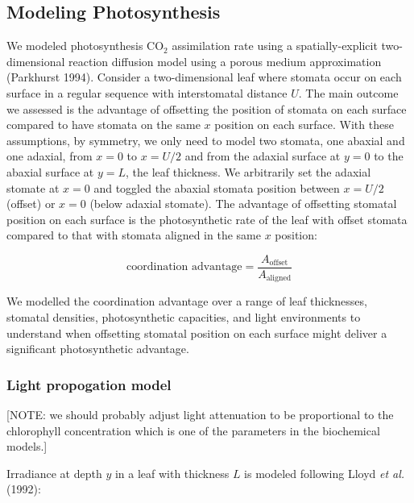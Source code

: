 \documentclass[12pt,halfline,a4paper,]{ouparticle}
\begin{document}
\hypertarget{modeling-photosynthesis}{%
\subsection{Modeling Photosynthesis}\label{modeling-photosynthesis}}

We modeled photosynthesis CO\(_2\) assimilation rate using a
spatially-explicit two-dimensional reaction diffusion model using a
porous medium approximation (Parkhurst 1994). Consider a two-dimensional
leaf where stomata occur on each surface in a regular sequence with
interstomatal distance \(U\). The main outcome we assessed is the
advantage of offsetting the position of stomata on each surface compared
to have stomata on the same \(x\) position on each surface. With these
assumptions, by symmetry, we only need to model two stomata, one abaxial
and one adaxial, from \(x = 0\) to \(x = U/2\) and from the adaxial
surface at \(y = 0\) to the abaxial surface at \(y = L\), the leaf
thickness. We arbitrarily set the adaxial stomate at \(x = 0\) and
toggled the abaxial stomata position between \(x = U/2\) (offset) or
\(x = 0\) (below adaxial stomate). The advantage of offsetting stomatal
position on each surface is the photosynthetic rate of the leaf with
offset stomata compared to that with stomata aligned in the same \(x\)
position:

\begin{equation} \label{eq:coordination_advantage}
  \text{coordination advantage} = \frac{A_\text{offset}}{A_\text{aligned}}
\end{equation}

We modelled the coordination advantage over a range of leaf thicknesses,
stomatal densities, photosynthetic capacities, and light environments to
understand when offsetting stomatal position on each surface might
deliver a significant photosynthetic advantage.

\hypertarget{light-propogation-model}{%
\subsubsection{Light propogation model}\label{light-propogation-model}}

{[}NOTE: we should probably adjust light attenuation to be proportional
to the chlorophyll concentration which is one of the parameters in the
biochemical models.{]}

Irradiance at depth \(y\) in a leaf with thickness \(L\) is modeled
following Lloyd \emph{et al.} (1992):
\end{document}
